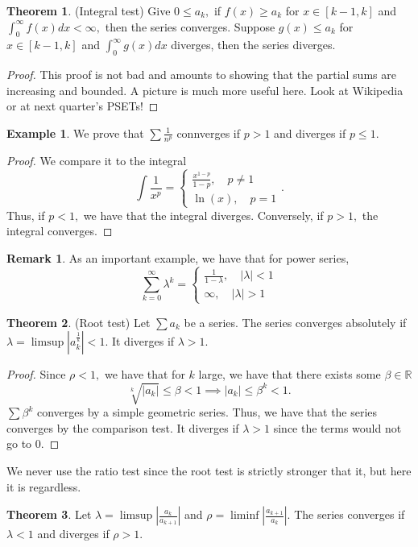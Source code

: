 \documentclass[10pt, oneside]{article}
\newcommand{\bbR}{\mathbb{R}}
\theoremstyle{definition}
\newtheorem{exmp}{Example}[section]
\newtheorem{thm}{Theorem}
\newtheorem{rem}{Remark}
\begin{document}
\begin{thm}
    (Integral test) Give $0 \leq a_k,$ if $f(x) \geq a_k$ for $x \in [k-1, k]$ and $\int_0^\infty f(x)dx < \infty,$ then the series converges. Suppose $g(x)\leq a_k$ for $x\in [k-1, k]$ and $\int_0^\infty g(x)dx $ diverges, then the series diverges.  
\end{thm}
\begin{proof}
    This proof is not bad and amounts to showing that the partial sums are increasing and bounded. A picture is much more useful here. Look at Wikipedia or at next quarter's PSETs!
\end{proof}
\begin{exmp}
    We prove that $\sum \frac{1}{n^p}$ connverges if $p>1$ and diverges if $p\leq 1.$
    \begin{proof}
    We compare it to the integral 
    \[\int \frac{1}{x^p} = 
    \begin{cases}
        \frac{x^{1-p}}{1-p}, \quad p \neq 1\\
        \ln(x), \quad p=1
    \end{cases}.\] Thus, if $p<1,$ we have that the integral diverges. Conversely, if $p>1,$ the integral converges.
\end{proof}
\end{exmp}
\begin{rem}
    As an important example, we have that for power series, 
    \[\sum_{k=0}^\infty \lambda^k = \begin{cases}
        \frac{1}{1-\lambda}, \quad |\lambda|< 1\\
        \infty, \quad |\lambda|>1
    \end{cases}\]
\end{rem}
\begin{thm}
    (Root test) Let $\sum a_k$ be a series. The series converges absolutely if $\lambda = \limsup |a_k^\frac{1}{k}| < 1.$ It diverges if $\lambda >1.$ 
\end{thm}
\begin{proof}
    Since $\rho <1,$ we have that for $k$ large, we have that there exists some $\beta \in \bbR$
    \[\sqrt[k]{|a_k|} \leq \beta < 1\implies |a_k| \leq \beta ^k <1.\] $\sum \beta^k$ converges by a simple geometric series. Thus, we have that the series converges by the comparison test. It diverges if $\lambda>1$ since the terms would not go to $0.$
\end{proof}
We never use the ratio test since the root test is strictly stronger that it, but here it is regardless.
\begin{thm}
    Let $\lambda = \limsup \left| \frac{a_k}{a_{k+1}}\right|$ and $\rho = \liminf \left| \frac{a_{k+1}}{a_{k}}\right|.$ The series converges if $\lambda <1$ and diverges if $\rho>1.$
\end{thm}
\end{document}
